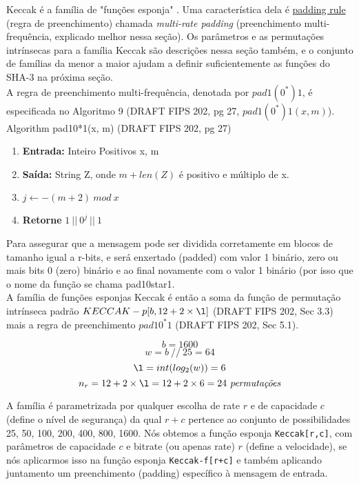 \documentclass[12pt, a4paper]{article}
\begin{document}
\begin{enumerate}
\begin{enumerate}
Keccak é a família de "funções esponja" \cite{bertoni}. Uma característica dela
é \underline{padding rule} (regra de preenchimento) chamada \textit{multi-rate
padding} (preenchimento multi-frequência, explicado melhor nessa seção). Os
parâmetros e as permutações intrínsecas para a família Keccak são descrições
nessa seção também, e o conjunto de famílias da menor a maior ajudam a definir
suficientemente as funções do SHA-3 na próxima seção.\\

A regra de preenchimento multi-frequência, denotada por $pad1(0^{*})1$, é
especificada no Algoritmo 9 (DRAFT FIPS 202, pg 27, $pad1(0^{*})1(x,m)$).\\

Algorithm pad10*1(x, m) (DRAFT FIPS 202, pg 27)

  \begin{enumerate}
    \item \textbf{Entrada:} Inteiro Positivos x, m
    \item \textbf{Saída:} String Z, onde $m+len(Z)$ é positivo e múltiplo de x.
    \item $j \leftarrow -(m+2)\ mod\ x$
    \item \textbf{Retorne} $1\ ||\ 0^{j}\ ||\ 1$\\
  \end{enumerate}

Para assegurar que a mensagem pode ser dividida corretamente em blocos de
tamanho igual a r-bits, e será enxertado (padded) com valor 1 binário, zero ou
mais bits 0 (zero) binário e ao final novamente com o valor 1 binário (por isso
que o nome da função se chama pad10star1.\\

A família de funções esponjas Keccak é então a soma da função de permutação
intrínseca padrão $KECCAK-p[b, 12 + 2\times \l]$ (DRAFT FIPS 202, Sec 3.3) mais
a regra de preenchimento $pad10^{*}1$ (DRAFT FIPS 202, Sec 5.1).


    $$b=1600$$
    $$w = b\ //\ 25 = 64$$
    $$\l = int(log_2(w)) = 6$$
    $$n_r = 12 + 2 \times \l = 12 + 2\times 6 = 24\ \textit{permutações}$$


A família é parametrizada por qualquer escolha de rate $r$ e de capacidade $c$
(define o nível de segurança) da qual $r+c$ pertence ao conjunto de
possibilidades {25, 50, 100, 200, 400, 800, 1600}. Nós obtemos a função esponja
\verb|Keccak[r,c]|, com parâmetros de capacidade $c$ e bitrate (ou apenas rate)
$r$ (define a velocidade), se nós aplicarmos isso na função esponja
\verb|Keccak-f[r+c]| e também aplicando juntamento um preenchimento (padding)
específico à mensagem de entrada.\\


\end{enumerate}
\end{enumerate}
\end{document}
